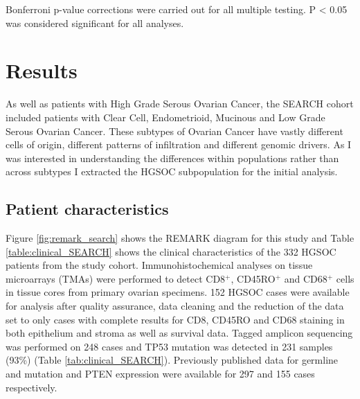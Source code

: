Bonferroni p-value corrections were carried out for all multiple testing. P < 0.05 was considered significant for all analyses. 


\section{Results}
 
As well as patients with High Grade Serous Ovarian Cancer, the SEARCH cohort included patients with Clear Cell, Endometrioid, Mucinous and Low Grade Serous Ovarian Cancer. These subtypes of Ovarian Cancer have vastly different cells of origin, different patterns of infiltration and different genomic drivers. As I was interested in understanding the differences within populations rather than across subtypes I extracted the HGSOC subpopulation for the initial analysis.

\subsection{Patient characteristics}
Figure {\ref{fig:remark_search}} shows the REMARK diagram for this study and Table \ref{table:clinical_SEARCH} shows the clinical characteristics of the 332 HGSOC patients from the study cohort. Immunohistochemical analyses on tissue microarrays (TMAs) were performed to detect CD8$^+$, CD45RO$^+$ and CD68$^+$ cells in tissue cores from primary ovarian specimens.  152 HGSOC cases were available for analysis after quality assurance, data cleaning and the reduction of the data set to only cases with complete results for CD8, CD45RO and CD68 staining in both epithelium and stroma as well as survival data. 
Tagged amplicon sequencing was performed on 248 cases and TP53 mutation was detected in 231 samples (93\%) (Table \ref{tab:clinical_SEARCH}). Previously published data for germline   and  mutation and PTEN expression were available for 297 and 155 cases respectively\cite{17,20}.

